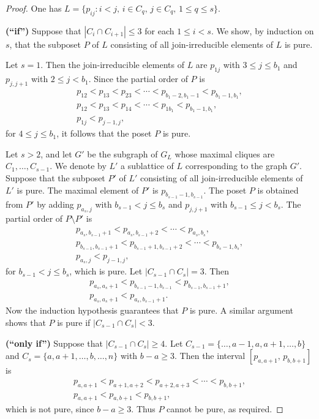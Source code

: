 \documentclass[12pt,a4paper]{amsart}
\theoremstyle{definition}
\begin{document}
\begin{proof}
One has 
$
L=\{p_{ij} : i<j, \, i\in C_q, \, j \in C_q, \, 1 \leq q \leq s \}.  
$

\smallskip

\noindent
{\bf (``if'')} Suppose that $|C_i \cap C_{i+1}| \leq 3$ for each $1 \leq i < s$.
We show, by induction on $s$, that the subposet $P$ of $L$ consisting
of all join-irreducible elements of $L$ is pure.

Let $s = 1$. Then the join-irreducible elements of $L$ are
$p_{1j}$ with $3 \leq j \leq b_1$ and $p_{j,j+1}$ with
$2 \leq j < b_1$.
Since the partial order of $P$ is
\begin{eqnarray*}
&p_{12} < p_{13} < p_{23} < \cdots < p_{b_1-2, b_1 - 1} < p_{b_1-1,b_1},&\\
&p_{12} < p_{13} < p_{14} < \cdots < p_{1b_1} < p_{b_1-1,b_1},&\\
& p_{1j} < p_{j-1,j},
\end{eqnarray*}
for $4 \leq j \leq b_1$, it follows that the poset $P$ is pure.

Let $s > 2$, and let $G'$ be the subgraph of $G_L$ whose maximal cliques
are $C_1, \ldots, C_{s-1}$. We denote by $L'$ a sublattice of $L$ corresponding to the graph $G'$.
Suppose that the subposet $P'$ of $L'$ consisting of all
join-irreducible elements of $L'$ is pure.
The maxi\-mal element of $P'$ is $p_{b_{s-1}-1, b_{s-1}}$.
The poset $P$ is obtained from $P'$ by adding $p_{a_s, j}$ with
$b_{s-1} < j \leq b_s$ and $p_{j,j+1}$ with
$b_{s-1} \leq j < b_s$.
The partial order of $P\setminus P'$ is
\begin{eqnarray*}
&p_{a_s, b_{s-1}+1} < p_{a_s, b_{s-1}+2} < \cdots < p_{a_s, b_s},&\\
&p_{b_{s-1}, b_{s-1}+1} < p_{b_{s-1}+1, b_{s-1}+2}
< \cdots < p_{b_s-1,b_s},&\\
& p_{a_s,j} < p_{j-1,j}, 
\end{eqnarray*}
for $b_{s-1} < j \leq b_s$, which is pure.
Let $|C_{s-1} \cap C_s| = 3$. Then
\begin{eqnarray*}
&p_{a_s, a_s+1} < p_{b_{s-1}-1,b_{s-1}} < p_{b_{s-1}, b_{s-1}+1},&\\
&p_{a_s, a_s+1} < p_{a_s, b_{s-1}+1}.&
\end{eqnarray*}
Now the induction hypothesis guarantees that $P$ is pure.
A similar argument shows that $P$ is pure if
$|C_{s-1} \cap C_s| < 3$.

\smallskip

\noindent
{\bf (``only if'')} Suppose that $|C_{s-1} \cap C_s| \geq 4$.
Let
$C_{s-1} = \{\ldots, a-1, a, a+1, \ldots, b\}$ and
$C_s = \{a, a+1, \ldots, b, \ldots, n\}$ with $b - a \geq 3$.
Then the interval $[p_{a,a+1},\, p_{b,b+1}]$ is 
\begin{eqnarray*}
&p_{a,a+1} < p_{a+1,a+2} < p_{a+2,a+3} < \cdots < p_{b,b+1},&\\
&p_{a,a+1} < p_{a,b+1} < p_{b,b+1},&
\end{eqnarray*}
which is not pure, since $b - a \geq 3$.
Thus $P$ cannot be pure, as required.
\end{proof}
\end{document}

